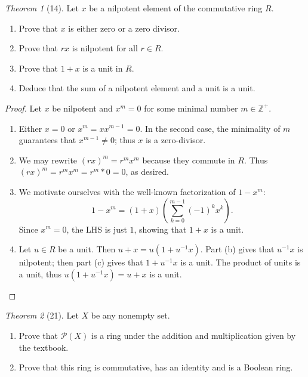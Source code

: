 \documentclass[12pt]{article}
\theoremstyle{remark}
\theoremstyle{named}
\newtheorem*{theorem}{Theorem}
\newcommand{\Z}{\mathbb Z}
\begin{document}
\begin{theorem}[14]
    Let \(x\) be a nilpotent element of the commutative ring \(R\).
    \begin{enumerate}
        \item Prove that \(x\) is either zero or a zero divisor.
        \item Prove that \(rx\) is nilpotent for all \(r \in R\).
        \item Prove that \(1 + x\) is a unit in \(R\). 
        \item Deduce that the sum of a nilpotent element and a unit is a unit.
    \end{enumerate}
\end{theorem}

\begin{proof}
    Let \(x\) be nilpotent and \(x^m = 0\) for some minimal number \(m \in \Z^+\).
    \begin{enumerate}
        \item Either \(x = 0\) or \(x^m = xx^{m - 1} = 0\). In the second case, the minimality of \(m\) guarantees that \(x^{m - 1} \neq 0\); thus \(x\) is a zero-divisor. 
         
        \item We may rewrite \((rx)^m = r^mx^m\) because they commute in \(R\). Thus \((rx)^m = r^mx^m = r^m*0 = 0\), as desired.
        
        \item We motivate ourselves with the well-known factorization of \(1 - x^m\):
        \[1 - x^m = (1 + x)\left(\sum_{k = 0}^{m - 1}(-1)^kx^k\right).\] 
        Since \(x^m = 0\), the LHS is just \(1\), showing that \(1 + x\) is a unit.

        \item Let \(u \in R\) be a unit. Then \(u + x = u(1 + u^{-1}x)\). Part (b) gives that \(u^{-1}x\) is nilpotent; then part (c) gives that \(1 + u^{-1}x\) is a unit. The product of units is a unit, thus \(u(1 + u^{-1}x) = u + x\) is a unit. 
    \end{enumerate}
\end{proof}

\begin{theorem}[21]
    Let \(X\) be any nonempty set.
    \begin{enumerate}
        \item Prove that \(\mathcal P (X)\) is a ring under the addition and multiplication given by the textbook.
        \item Prove that this ring is commutative, has an identity and is a Boolean ring.
    \end{enumerate}
\end{theorem}
\end{document}
